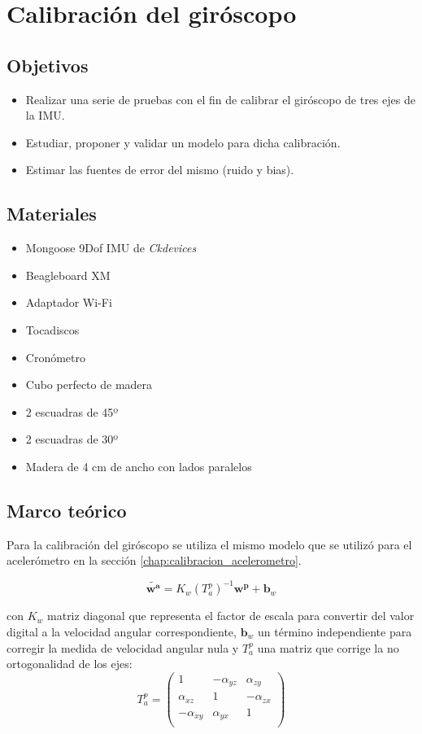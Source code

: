 \documentclass[main]{subfiles}
\begin{document}
\chapter{Calibración del giróscopo}

\section{Objetivos}

\begin{itemize}
	\item Realizar una serie de pruebas con el fin de calibrar el giróscopo de tres ejes de la IMU.
	\item Estudiar, proponer y validar un modelo para dicha calibración.
	\item Estimar las fuentes de error del mismo (ruido y bias).
\end{itemize}

\section{Materiales}
\begin{itemize}
\item Mongoose 9Dof IMU de \emph{Ckdevices}
\item Beagleboard XM
\item Adaptador Wi-Fi 
\item Tocadiscos
\item Cronómetro
\item Cubo perfecto de madera
\item 2 escuadras de 45º
\item 2 escuadras de 30º
\item Madera de 4 cm de ancho con lados paralelos
\end{itemize}

\section{Marco teórico}
Para la calibración del giróscopo se utiliza el mismo modelo que se utilizó para el acelerómetro en la sección \ref{chap:calibracion_acelerometro}.

\begin{equation}
\tilde{\mathbf{w^a}}=K_w(T_a^p)^{-1}\mathbf{w^p}+\mathbf{b}_w
\label{ec:modelo_gyro}
\end{equation}

con $K_w$ matriz diagonal que representa el factor de escala para convertir del valor digital a la velocidad angular correspondiente, $\mathbf{b}_w$ un término independiente para corregir la medida de velocidad angular nula y $T^p_a$ una matriz que corrige la no ortogonalidad de los ejes:
$$T^p_a=\left( 
\begin{matrix}
1 &-\alpha_{yz} &\alpha_{zy}\\
\alpha_{xz} &1& -\alpha_{zx} \\
-\alpha_{xy} &\alpha_{yx} &1\\
\end{matrix} 
\right)$$
\end{document}
